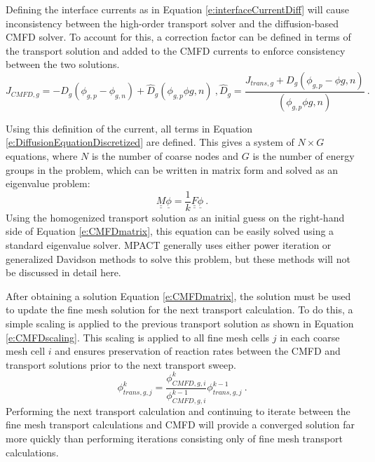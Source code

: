 Defining the interface currents as in Equation \ref{e:interfaceCurrentDiff} will cause inconsistency between the high-order transport solver and the diffusion-based CMFD solver.  To account for this, a correction factor can be defined in terms of the transport solution and added to the CMFD currents to enforce consistency between the two solutions.
\begin{subequations}\label{e:CMFDcouplingCoeffs}
\begin{equation}\label{e:interfaceCurrentCMFD}
J_{CMFD,g} = -D_g\left(\phi_{g,p} - \phi_{g,n}\right) + \hat{D}_g\left(\phi_{g,p} \phi{g,n}\right)\ ,
\end{equation}
\begin{equation}\label{e:dhat}
\hat{D}_g = \frac{J_{trans,g} + D_g\left(\phi_{g,p} - \phi{g,n}\right)}{\left(\phi_{g,p} \phi{g,n}\right)}\ .
\end{equation}
\end{subequations}

Using this definition of the current, all terms in Equation \ref{e:DiffusionEquationDiscretized} are defined.  This gives a system of $N\times G$ equations, where $N$ is the number of coarse nodes and $G$ is the number of energy groups in the problem, which can be written in matrix form and solved as an eigenvalue problem:
\begin{equation}\label{e:CMFDmatrix}
\underline{\underline{M}}\underline{\phi}=\frac{1}{k}\underline{\underline{F}}\underline{\phi}\ .
\end{equation}
Using the homogenized transport solution as an initial guess on the right-hand side of Equation \ref{e:CMFDmatrix}, this equation can be easily solved using a standard eigenvalue solver.  MPACT generally uses either power iteration or generalized Davidson methods to solve this problem, but these methods will not be discussed in detail here.

After obtaining a solution Equation \ref{e:CMFDmatrix}, the solution must be used to update the fine mesh solution for the next transport calculation.  To do this, a simple scaling is applied to the previous transport solution as shown in Equation \ref{e:CMFDscaling}.  This scaling is applied to all fine mesh cells $j$ in each coarse mesh cell $i$ and ensures preservation of reaction rates between the CMFD and transport solutions prior to the next transport sweep.
\begin{equation}\label{e:CMFDscaling}
\phi_{trans,g,j}^{k}=\frac{\phi_{CMFD,g,i}^k}{\phi_{CMFD,g,i}^{k-1}}\phi_{trans,g,j}^{k-1}\ .
\end{equation}
Performing the next transport calculation and continuing to iterate between the fine mesh transport calculations and CMFD will provide a converged solution far more quickly than performing iterations consisting only of fine mesh transport calculations.

